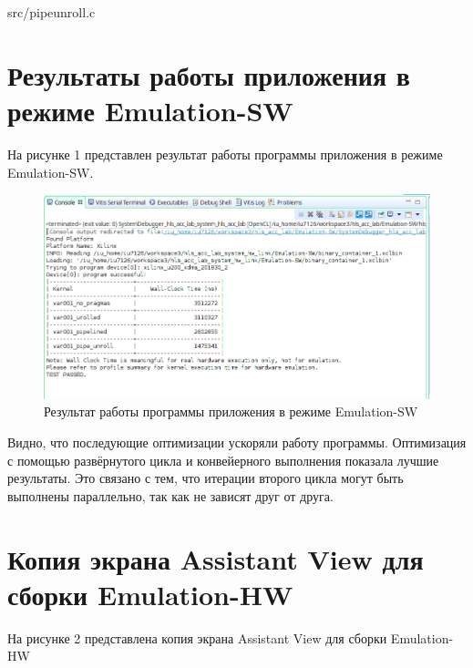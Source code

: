 \begin{lstinputlisting}[caption=Развернутый цикл и конвейерное исполнение, 
	basicstyle=\footnotesize\ttfamily, frame=single,breaklines=true]{src/pipeunroll.c}
\end{lstinputlisting}

\section*{Результаты работы приложения в режиме \newline Emulation-SW}
На рисунке 1 представлен результат работы программы приложения в режиме Emulation-SW.

\FloatBarrier
\begin{figure}[h]
	\begin{center}
		\includegraphics[width=\linewidth]{inc/emulationSWresult.png}
	\end{center}
	\caption{Результат работы программы приложения в режиме Emulation-SW}
\end{figure}
\FloatBarrier

Видно, что последующие оптимизации ускоряли работу программы.  
Оптимизация с помощью развёрнутого цикла и конвейерного выполнения показала лучшие результаты.
Это связано с тем, что итерации второго цикла могут быть выполнены параллельно, так как не зависят друг от друга.

\section*{Копия экрана Assistant View для \newline сборки Emulation-HW}
На рисунке 2 представлена копия экрана Assistant View для сборки Emulation-HW

